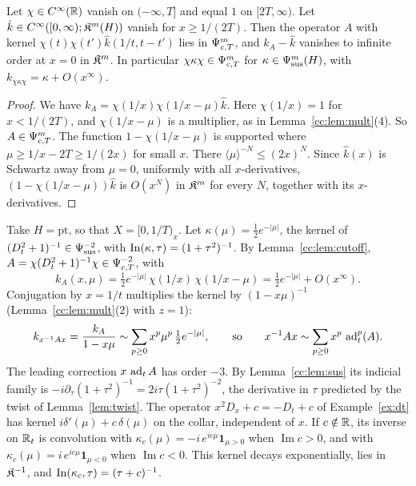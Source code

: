 \begin{lemma}
\label{cc:lem:cutoff}
Let \(\chi\in C^\infty(\mathbb R)\) vanish on \((-\infty,T]\) and equal \(1\) on
\([2T,\infty)\). Let \(\hat k\in C^\infty([0,\infty);\mathfrak K^m(H))\) vanish for
\(x\ge1/(2T)\). Then the operator \(A\) with kernel
\(\chi(t)\chi(t')\hat k(1/t,t-t')\) lies in \(\Psi_{c,T}^m\), and
\(k_A-\hat k\) vanishes to infinite order at \(x=0\) in
\(\mathfrak K^m\). In particular \(\chi\kappa\chi\in\Psi_{c,T}^m\) for
\(\kappa\in\Psi_{\mathrm{sus}}^m(H)\), with \(k_{\chi\kappa\chi}=\kappa+O(x^\infty)\).
\end{lemma}

\begin{proof}
We have \(k_A=\chi(1/x)\chi(1/x-\mu)\hat k\). Here \(\chi(1/x)=1\) for
\(x<1/(2T)\), and \(\chi(1/x-\mu)\) is a multiplier, as in
Lemma~\ref{cc:lem:mult}(4). So \(A\in\Psi_{c,T}^m\). The function
\(1-\chi(1/x-\mu)\) is supported where \(\mu\ge1/x-2T\ge1/(2x)\) for small
\(x\). There \(\langle\mu\rangle^{-N}\le(2x)^N\). Since \(\hat k(x)\) is
Schwartz away from \(\mu=0\), uniformly with all \(x\)-derivatives,
\((1-\chi(1/x-\mu))\hat k\) is \(O(x^N)\) in \(\mathfrak K^m\) for every
\(N\), together with its \(x\)-derivatives.
\end{proof}

\begin{example}\label{cc:ex:halfline}
Take \(H=\mathrm{pt}\), so that \(X=[0,1/T)_x\). Let \(\kappa(\mu)=
\frac12e^{-|\mu|}\), the kernel of \((D_t^2+1)^{-1}\in\Psi_{\mathrm{sus}}^{-2}\), with
\(\operatorname{In}(\kappa,\tau)=(1+\tau^2)^{-1}\). By Lemma~\ref{cc:lem:cutoff},
\(A=\chi(D_t^2+1)^{-1}\chi\in\Psi_{c,T}^{-2}\), with
\[
 k_A(x,\mu)=\tfrac12e^{-|\mu|}\,\chi(1/x)\,\chi(1/x-\mu)
 =\tfrac12e^{-|\mu|}+O(x^\infty).
\]
Conjugation by \(x=1/t\) multiplies the kernel by \((1-x\mu)^{-1}\)
(Lemma~\ref{cc:lem:mult}(2) with \(z=1\)):
\[
 k_{x^{-1}Ax}=\frac{k_A}{1-x\mu}\sim\sum_{p\ge0}x^p\mu^p\,\tfrac12e^{-|\mu|},
 \qquad\text{so}\qquad
 x^{-1}Ax\sim\sum_{p\ge0}x^p\,\operatorname{ad}_t^p(A).
\]
The leading correction \(x\,\operatorname{ad}_t A\) has order \(-3\). By
Lemma~\ref{cc:lem:sus} its indicial family is
\(-i\partial_\tau(1+\tau^2)^{-1}=2i\tau(1+\tau^2)^{-2}\), the derivative
in \(\tau\) predicted by the twist of Lemma~\ref{lem:twist}. The
operator \(x^2D_x+c=-D_t+c\) of Example~\ref{ex:dt} has kernel
\(i\delta'(\mu)+c\,\delta(\mu)\) on the collar, independent of \(x\). If
\(c\notin\mathbb R\), its inverse on \(\mathbb R_t\) is convolution with
\(\kappa_c(\mu)=-i\,e^{ic\mu}\mathbf 1_{\mu>0}\) when
\(\operatorname{Im}c>0\), and with \(\kappa_c(\mu)=i\,e^{ic\mu}
\mathbf 1_{\mu<0}\) when \(\operatorname{Im}c<0\). This kernel decays
exponentially, lies in \(\mathfrak K^{-1}\), and
\(\operatorname{In}(\kappa_c,\tau)=(\tau+c)^{-1}\).
\end{example}

